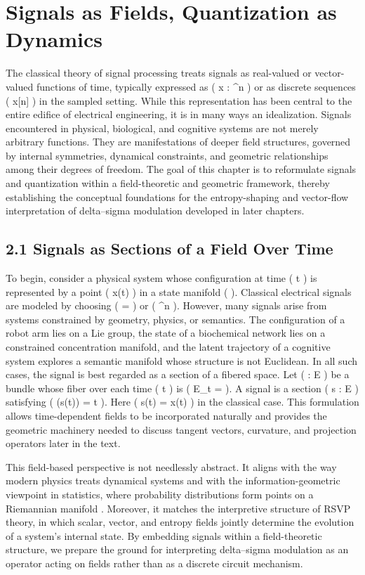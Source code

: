 \chapter{Signals as Fields, Quantization as Dynamics}

The classical theory of signal processing treats signals as real-valued or vector-valued functions of time, typically expressed as ( x :  \to {}^n ) or as discrete sequences ( x[n] ) in the sampled setting. While this representation has been central to the entire edifice of electrical engineering, it is in many ways an idealization. Signals encountered in physical, biological, and cognitive systems are not merely arbitrary functions. They are manifestations of deeper field structures, governed by internal symmetries, dynamical constraints, and geometric relationships among their degrees of freedom. The goal of this chapter is to reformulate signals and quantization within a field-theoretic and geometric framework, thereby establishing the conceptual foundations for the entropy-shaping and vector-flow interpretation of delta--sigma modulation developed in later chapters.

\section*{2.1 Signals as Sections of a Field Over Time}

To begin, consider a physical system whose configuration at time ( t ) is represented by a point ( x(t) ) in a state manifold (  ). Classical electrical signals are modeled by choosing (  =  ) or ( ^n ). However, many signals arise from systems constrained by geometry, physics, or semantics. The configuration of a robot arm lies on a Lie group, the state of a biochemical network lies on a constrained concentration manifold, and the latent trajectory of a cognitive system explores a semantic manifold whose structure is not Euclidean. In all such cases, the signal is best regarded as a section of a fibered space. Let ( \pi : E \to {} ) be a bundle whose fiber over each time ( t ) is ( E_t =  ). A signal is a section ( s :  \to E ) satisfying ( \pi(s(t)) = t ). Here ( s(t) = x(t) ) in the classical case. This formulation allows time-dependent fields to be incorporated naturally and provides the geometric machinery needed to discuss tangent vectors, curvature, and projection operators later in the text.

This field-based perspective is not needlessly abstract. It aligns with the way modern physics treats dynamical systems \citep{arnold1989mathematical} and with the information-geometric viewpoint in statistics, where probability distributions form points on a Riemannian manifold \citep{amari2016information}. Moreover, it matches the interpretive structure of RSVP theory, in which scalar, vector, and entropy fields jointly determine the evolution of a system's internal state. By embedding signals within a field-theoretic structure, we prepare the ground for interpreting delta--sigma modulation as an operator acting on fields rather than as a discrete circuit mechanism.

